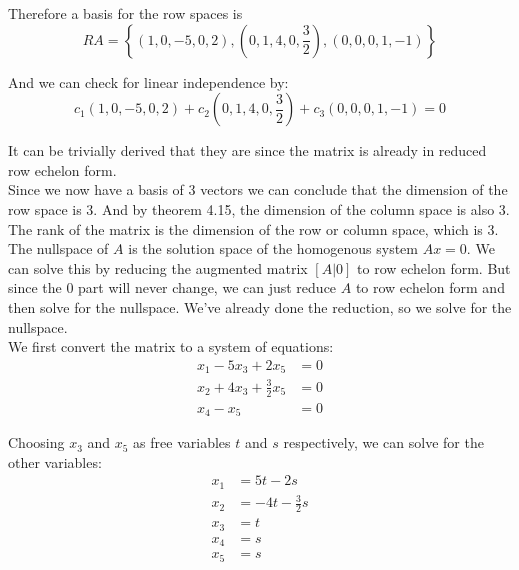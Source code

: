 Therefore a basis for the row spaces is
$$
	RA = \left\{(1,0,-5,0,2), \left(0,1,4,0,\frac{3}{2}\right), (0,0,0,1,-1)\right\}
$$

And we can check for linear independence by:
$$
	c_1(1,0,-5,0,2) + c_2\left(0,1,4,0,\frac{3}{2}\right) + c_3(0,0,0,1,-1) = 0
$$

It can be trivially derived that they are since the matrix is already in reduced row echelon form.\\[1ex]

Since we now have a basis of 3 vectors we can conclude that the dimension of the row space is 3. And by theorem 4.15, the dimension of the column space is also 3.\\[1ex]

The rank of the matrix is the dimension of the row or column space, which is 3.\\[1ex]

The nullspace of $A$ is the solution space of the homogenous system $Ax = 0$. We can solve this by reducing the augmented matrix $[A|0]$ to row echelon form. But since the 0 part will never change, we can just reduce $A$ to row echelon form and then solve for the nullspace. We've already done the reduction, so we solve for the nullspace.\\[1ex]

We first convert the matrix to a system of equations:
\begin{align*}
	x_1 - 5x_3 + 2x_5           & = 0 \\
	x_2 + 4x_3 + \frac{3}{2}x_5 & = 0 \\
	x_4 - x_5                   & = 0
\end{align*}

Choosing $x_3$ and $x_5$ as free variables $t$ and $s$ respectively, we can solve for the other variables:
\begin{align*}
	x_1 & = 5t - 2s            \\
	x_2 & = -4t - \frac{3}{2}s \\
	x_3 & = t                  \\
	x_4 & = s                  \\
	x_5 & = s
\end{align*}

